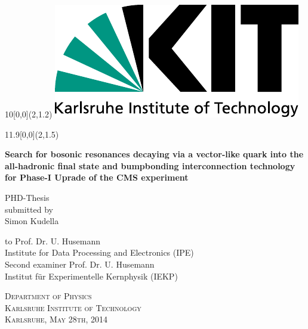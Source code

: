 \pagestyle{empty}
\thispagestyle{empty}

\newcommand{\diameter}{20}
\newcommand{\xone}{-26}
\newcommand{\xtwo}{148}
\newcommand{\yone}{22}
\newcommand{\ytwo}{-245}

\begin{titlepage}


\begin{textblock}{10}[0,0](2,1.2)
		\includegraphics[width=.3\textwidth]{logos/KITLogo_RGB.pdf}
	\end{textblock}
	
\begin{textblock}{11.9}[0,0](2,1.5)
     \end{textblock}	
	
	
\begin{center}
\vspace*{32mm}\huge{\textbf{Search for bosonic resonances decaying via a vector-like quark into the all-hadronic final state and bumpbonding interconnection technology for Phase-I Uprade of the CMS experiment}} \vspace*{25mm}

\LARGE{PHD-Thesis} \\[2ex]
\normalsize{submitted by} \\[2ex]
\LARGE{Simon Kudella} \\\vspace*{25mm}
 
\normalsize{to Prof. Dr. U. Husemann} \\[1ex] \normalsize{Institute for Data Processing and Electronics (IPE)} \\[6ex]
\normalsize{Second examiner Prof. Dr. U. Husemann} \\[1ex] 
\normalsize{Institut f\"ur Experimentelle Kernphysik (IEKP)} 


\vspace*{20mm} 
\textsc{\Large{Department of Physics\\[1ex] 
Karlsruhe Institute of Technology} \\[4ex] 
\normalsize{Karlsruhe, May 28th, 2014}}


\end{center}
\end{titlepage}
